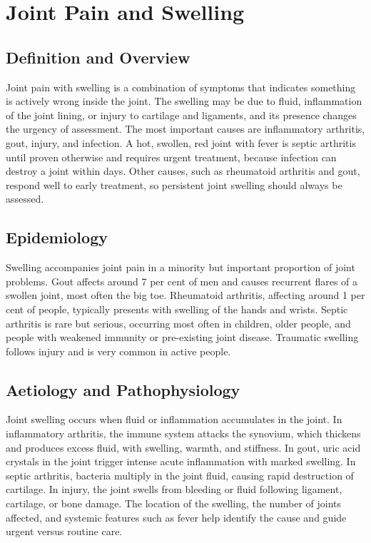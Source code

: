 \chapter{Joint Pain and Swelling}

\section*{Definition and Overview}
Joint pain with swelling is a combination of symptoms that indicates something is actively wrong inside the joint. The swelling may be due to fluid, inflammation of the joint lining, or injury to cartilage and ligaments, and its presence changes the urgency of assessment. The most important causes are inflammatory arthritis, gout, injury, and infection. A hot, swollen, red joint with fever is septic arthritis until proven otherwise and requires urgent treatment, because infection can destroy a joint within days. Other causes, such as rheumatoid arthritis and gout, respond well to early treatment, so persistent joint swelling should always be assessed.

\section*{Epidemiology}
Swelling accompanies joint pain in a minority but important proportion of joint problems. Gout affects around 7 per cent of men and causes recurrent flares of a swollen joint, most often the big toe. Rheumatoid arthritis, affecting around 1 per cent of people, typically presents with swelling of the hands and wrists. Septic arthritis is rare but serious, occurring most often in children, older people, and people with weakened immunity or pre-existing joint disease. Traumatic swelling follows injury and is very common in active people.

\section*{Aetiology and Pathophysiology}
Joint swelling occurs when fluid or inflammation accumulates in the joint. In inflammatory arthritis, the immune system attacks the synovium, which thickens and produces excess fluid, with swelling, warmth, and stiffness. In gout, uric acid crystals in the joint trigger intense acute inflammation with marked swelling. In septic arthritis, bacteria multiply in the joint fluid, causing rapid destruction of cartilage. In injury, the joint swells from bleeding or fluid following ligament, cartilage, or bone damage. The location of the swelling, the number of joints affected, and systemic features such as fever help identify the cause and guide urgent versus routine care.

